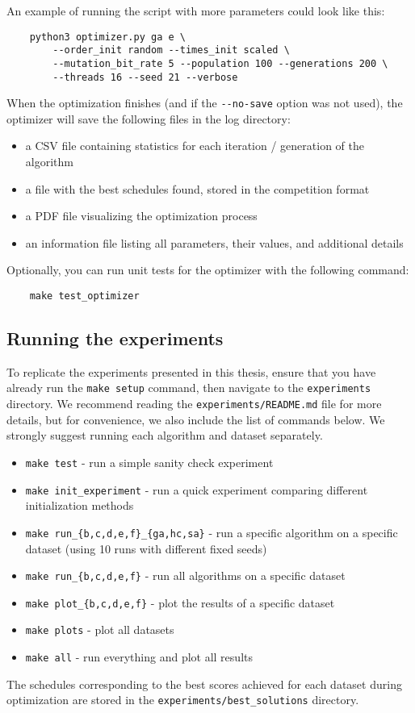 An example of running the script with more parameters could look like this:
\begin{verbatim}
    python3 optimizer.py ga e \
        --order_init random --times_init scaled \
        --mutation_bit_rate 5 --population 100 --generations 200 \
        --threads 16 --seed 21 --verbose
\end{verbatim}
When the optimization finishes (and if the \verb|--no-save| option was not used), the optimizer will save the following files in the log directory:
\begin{itemize}
    \item a CSV file containing statistics for each iteration / generation of the algorithm
    \item a file with the best schedules found, stored in the competition format
    \item a PDF file visualizing the optimization process
    \item an information file listing all parameters, their values, and additional details
\end{itemize}

\bigskip

Optionally, you can run unit tests for the optimizer with the following command:
\begin{verbatim}
    make test_optimizer
\end{verbatim}

\subsection{Running the experiments}

To replicate the experiments presented in this thesis, ensure that you have already run the \verb|make setup| command, then navigate to the \verb|experiments| directory. We recommend reading the \verb|experiments/README.md| file for more details, but for convenience, we also include the list of commands below. We strongly suggest running each algorithm and dataset separately.
\begin{itemize}
    \item \verb|make test| - run a simple sanity check experiment
    \item \verb|make init_experiment| - run a quick experiment comparing different initialization methods
    \item \verb|make run_{b,c,d,e,f}_{ga,hc,sa}| - run a specific algorithm on a specific dataset (using 10 runs with different fixed seeds)
    \item \verb|make run_{b,c,d,e,f}| - run all algorithms on a specific dataset
    \item \verb|make plot_{b,c,d,e,f}| - plot the results of a specific dataset
    \item \verb|make plots| - plot all datasets
    \item \verb|make all| - run everything and plot all results
\end{itemize}

The schedules corresponding to the best scores
achieved for each dataset during optimization are stored in the \verb|experiments/best_solutions| directory.
